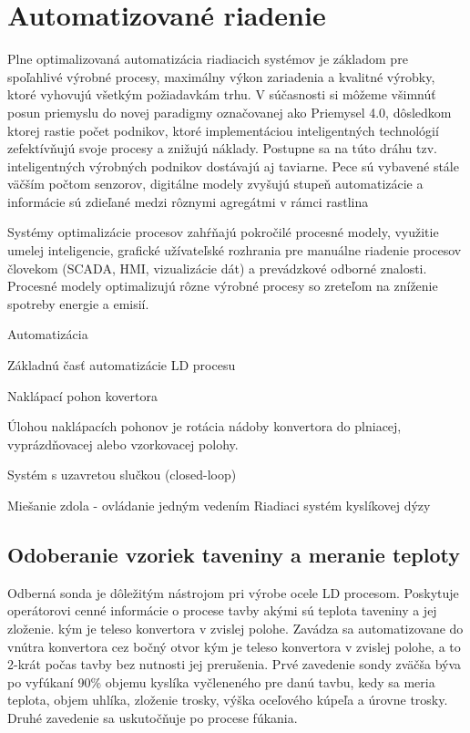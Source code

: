 \documentclass[]{tukediphc}
\begin{document}
\section{Automatizované riadenie}

Plne optimalizovaná automatizácia riadiacich systémov je základom pre spoľahlivé výrobné procesy, maximálny výkon zariadenia a kvalitné výrobky, ktoré vyhovujú všetkým požiadavkám trhu. V súčasnosti si môžeme všimnúť posun priemyslu do novej paradigmy označovanej ako Priemysel 4.0, dôsledkom ktorej rastie počet podnikov, ktoré implementáciou inteligentných technológií zefektívňujú svoje procesy a znižujú náklady. Postupne sa na túto dráhu tzv. inteligentných výrobných podnikov dostávajú aj taviarne. Pece sú vybavené stále väčším počtom senzorov, digitálne modely zvyšujú stupeň automatizácie a informácie sú zdieľané medzi rôznymi agregátmi v rámci
rastlina


Systémy optimalizácie procesov zahŕňajú pokročilé procesné modely, využitie umelej inteligencie, grafické užívateľské rozhrania pre manuálne riadenie procesov človekom (SCADA, HMI, vizualizácie dát) a prevádzkové odborné znalosti. Procesné modely optimalizujú rôzne výrobné procesy so zreteľom na zníženie spotreby energie a emisií.

Automatizácia

Základnú časť automatizácie LD procesu


Naklápací pohon kovertora

Úlohou naklápacích pohonov je rotácia nádoby konvertora do plniacej, vyprázdňovacej alebo vzorkovacej polohy.

Systém s uzavretou slučkou (closed-loop)



Miešanie zdola - ovládanie jedným vedením
Riadiaci systém kyslíkovej dýzy

\subsection{Odoberanie vzoriek taveniny a meranie teploty}

Odberná sonda je dôležitým nástrojom pri výrobe ocele LD procesom. Poskytuje operátorovi cenné informácie o procese tavby akými sú teplota taveniny a jej zloženie. kým je teleso konvertora v zvislej polohe. Zavádza sa automatizovane do vnútra konvertora cez bočný otvor kým je teleso konvertora v zvislej polohe, a to 2-krát počas tavby bez nutnosti jej prerušenia. Prvé zavedenie sondy zväčša býva po vyfúkaní 90\% objemu kyslíka vyčleneného pre danú tavbu, kedy sa meria teplota, objem uhlíka, zloženie trosky, výška oceľového kúpeľa a úrovne trosky. Druhé zavedenie sa uskutočňuje po procese fúkania.
\end{document}
